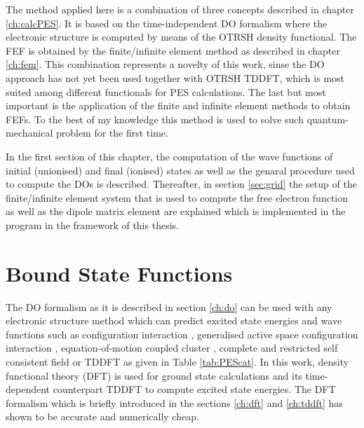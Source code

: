 \label{ch:proced}
The method applied here is a combination of three concepts described in chapter \ref{ch:calcPES}.
It is based on the time-independent DO formalism where the electronic structure is computed by means of the OTRSH density functional.
The FEF is obtained by the finite/infinite element method as described in chapter \ref{ch:fem}.
This combination represents a novelty of this work, sinse the DO approach has not yet been used together with OTRSH TDDFT, which is most suited among different functionals for PES calculations.
The last but most important is the application of the finite and infinite element methods to obtain FEFs.
To the best of my knowledge this method is used to solve such quantum-mechanical problem for the first time.

In the first section of this chapter, the computation of the wave functions of initial (unionised) and final (ionised) states as well as the genaral procedure used to compute the DOs is described.
Thereafter, in section \ref{sec:grid} the setup of the finite/infinite element system that is used to compute the free electron function as well as the dipole matrix element are explained which is implemented in the program  \cite{FreeWilly} in the framework of this thesis.

\section{Bound State Functions}
The DO formalism as it is described in section \ref{ch:do} can be used with any electronic structure method which can predict excited state energies and wave functions such as configuration interaction \cite{ci1}, generalised active space configuration interaction \cite{bauch1}, equation-of-motion coupled cluster \cite{CAPccEOM,eomCCdo}, complete and restricted self consistent field \cite{MAgg,GrellKuehn,asscf1,asscf2} or TDDFT as given in Table \ref{tab:PEScat}.
In this work, density functional theory (DFT) is used for ground state calculations and its time-dependent counterpart TDDFT to compute excited state energies.
The DFT formalism which is briefly introduced in the sections \ref{ch:dft} and \ref{ch:tddft} has shown to be accurate and numerically cheap.


